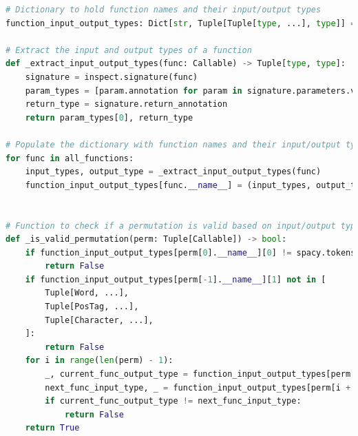 \documentclass{beamer}
\begin{document}
\begin{frame}[fragile]{}
    \begin{lstlisting}[language=Python]
# Dictionary to hold function names and their input/output types
function_input_output_types: Dict[str, Tuple[Tuple[type, ...], type]] = {}

# Extract the input and output types of a function
def _extract_input_output_types(func: Callable) -> Tuple[type, type]:
    signature = inspect.signature(func)
    param_types = [param.annotation for param in signature.parameters.values()]
    return_type = signature.return_annotation
    return param_types[0], return_type

# Populate the dictionary with function names and their input/output types
for func in all_functions:
    input_types, output_type = _extract_input_output_types(func)
    function_input_output_types[func.__name__] = (input_types, output_type)


# Function to check if a permutation is valid based on input/output types
def _is_valid_permutation(perm: Tuple[Callable]) -> bool:
    if function_input_output_types[perm[0].__name__][0] != spacy.tokens.doc.Doc:
        return False
    if function_input_output_types[perm[-1].__name__][1] not in [
        Tuple[Word, ...],
        Tuple[PosTag, ...],
        Tuple[Character, ...],
    ]:
        return False
    for i in range(len(perm) - 1):
        _, current_func_output_type = function_input_output_types[perm[i].__name__]
        next_func_input_type, _ = function_input_output_types[perm[i + 1].__name__]
        if current_func_output_type != next_func_input_type:
            return False
    return True
    \end{lstlisting}
\end{frame}
\end{document}
